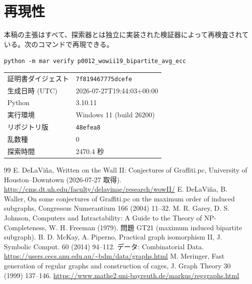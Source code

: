 \documentclass[paper=a4,fontsize=10.5pt,jafontsize=10.5pt]{jlreq}
\theoremstyle{plain}
\theoremstyle{definition}
\begin{document}
\section*{再現性}
本稿の主張はすべて、探索器とは独立に実装された検証器によって再検査されている。次のコマンドで再現できる。

\begin{center}\texttt{python -m mar verify p0012\_wowii19\_bipartite\_avg\_ecc}\end{center}

\begin{center}\begin{tabular}{ll}\toprule
証明書ダイジェスト & \texttt{7f819467775dcefe} \\
生成日時 (UTC) & 2026-07-27T19:44:03+00:00 \\
Python & 3.10.11 \\
実行環境 & Windows 11 (build 26200) \\
リポジトリ版 & \texttt{48efea8} \\
乱数種 & 0 \\
探索時間 & 2470.4 秒 \\
\bottomrule\end{tabular}\end{center}


\begin{thebibliography}{99}
 E. DeLaViña, Written on the Wall II: Conjectures of Graffiti.pc, University of Houston--Downtown (2026-07-27 取得). \url{http://cms.dt.uh.edu/faculty/delavinae/research/wowII/}
 E. DeLaViña, B. Waller, On some conjectures of Graffiti.pc on the maximum order of induced subgraphs, Congressus Numerantium 166 (2004) 11--32.
 M. R. Garey, D. S. Johnson, Computers and Intractability: A Guide to the Theory of NP-Completeness, W. H. Freeman (1979). 問題 GT21 (maximum induced bipartite subgraph).
 B. D. McKay, A. Piperno, Practical graph isomorphism II, J. Symbolic Comput. 60 (2014) 94--112. データ: Combinatorial Data. \url{https://users.cecs.anu.edu.au/~bdm/data/graphs.html}
 M. Meringer, Fast generation of regular graphs and construction of cages, J. Graph Theory 30 (1999) 137--146. \url{https://www.mathe2.uni-bayreuth.de/markus/reggraphs.html}
\end{thebibliography}
\end{document}
